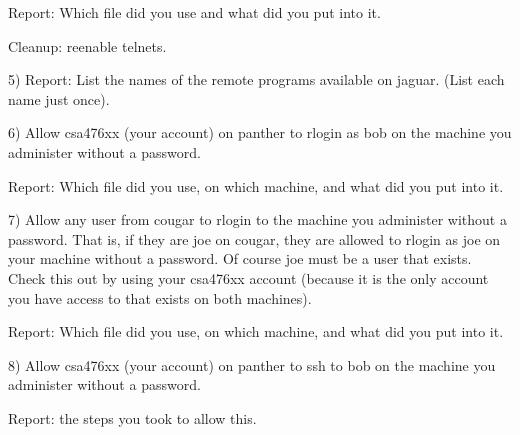 Report: Which file did you use and what did you put into it.

Cleanup: reenable telnets.

5) Report: List the names of the remote programs available on {\ltt{}jaguar}.
(List each name just once).

6) Allow {\ltt{}csa476xx} (your account) on {\ltt{}panther} to rlogin as 
{\ltt{}bob} on the machine you administer without a password.

Report: Which file did you use, on which machine, and what did you put into it.

7) Allow any user from {\ltt{}cougar} to rlogin to the machine you administer 
without a password.
That is, if they are {\ltt{}joe} on {\ltt{}cougar}, they are allowed to
rlogin as {\ltt{}joe} on your machine without a password.
Of course {\ltt{}joe} must be  a user that exists.
Check this out by using your {\ltt{}csa476xx} account (because it is the only
account you have access to that exists on both machines).

Report: Which file did you use, on which machine, and what did you put into it.

8) Allow {\ltt{}csa476xx} (your account) on {\ltt{}panther} to ssh to
{\ltt{}bob} on the machine you administer without a password.

Report: the steps you took to allow this.

\bye
